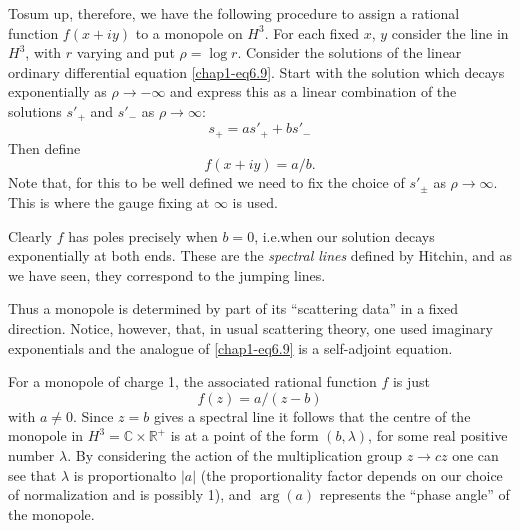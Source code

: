 To\pageoriginale sum up, therefore, we have the following procedure to assign a
rational function $f(x+iy)$ to a monopole on $H^{3}$. For each fixed
$x$, $y$ consider the line in $H^{3}$, with $r$ varying and put
$\rho=\log r$. Consider the solutions of the linear ordinary
differential equation \eqref{chap1-eq6.9}. Start with the solution
which decays exponentially as $\rho\to -\infty$ and express this as a
linear combination of the solutions $s'_{+}$ and $s'_{-}$ as
$\rho\to \infty$: 
$$
s_{+}=as'_{+}+bs'_{-}
$$
Then define
$$
f(x+iy)=a/b.
$$
Note that, for this to be well defined we need to fix the choice of
$s'_{\pm}$ as $\rho\to \infty$. This is where the gauge fixing at
$\infty$ is used.

Clearly $f$ has poles precisely when $b=0$, i.e.\@ when our solution
decays exponentially at both ends. These are the {\em spectral lines}
defined by Hitchin, and as we have seen, they correspond to the
jumping lines.

Thus a monopole is determined by part of its ``scattering data'' in a
fixed direction. Notice, however, that, in usual scattering theory,
one used imaginary exponentials and the analogue
of \eqref{chap1-eq6.9} is a self-adjoint equation.

For a monopole of charge 1, the associated rational function $f$ is
just
\begin{equation}
f(z)=a/(z-b)\label{chap1-eq6.10}
\end{equation}
with $a\neq 0$. Since $z=b$ gives a spectral line it follows that the
centre of the monopole in $H^{3}=\mathbb{C}\times \mathbb{R}^{+}$ is
at a point of the form $(b,\lambda)$, for some real positive number
$\lambda$. By considering the action of the multiplication group $z\to
cz$ one can see that $\lambda$ is proportional\pageoriginale to $|a|$
(the proportionality factor depends on our choice of normalization and
is possibly 1), and $\arg(a)$ represents the ``phase angle'' of the
monopole. 

